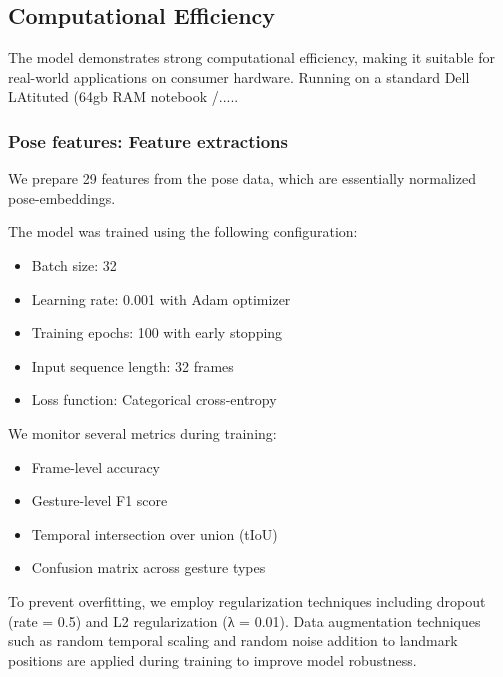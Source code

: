 \subsection{Computational Efficiency}
The model demonstrates strong computational efficiency, making it suitable for real-world applications on consumer hardware. Running on a standard Dell LAtituted (64gb RAM notebook /.....%


\subsubsection{Pose features: Feature extractions}
We prepare 29 features from the pose data, which are essentially normalized pose-embeddings. 

The model was trained using the following configuration:
\begin{itemize}
    \item Batch size: 32
    \item Learning rate: 0.001 with Adam optimizer
    \item Training epochs: 100 with early stopping
    \item Input sequence length: 32 frames
    \item Loss function: Categorical cross-entropy
\end{itemize}

We monitor several metrics during training:
\begin{itemize}
    \item Frame-level accuracy
    \item Gesture-level F1 score
    \item Temporal intersection over union (tIoU)
    \item Confusion matrix across gesture types
\end{itemize}

To prevent overfitting, we employ regularization techniques including dropout (rate = 0.5) and L2 regularization (λ = 0.01). Data augmentation techniques such as random temporal scaling and random noise addition to landmark positions are applied during training to improve model robustness.
\fi